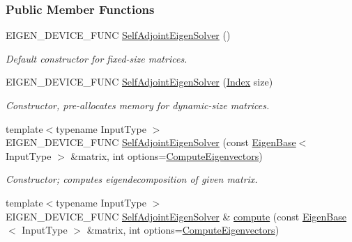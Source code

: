 \subsubsection*{Public Member Functions}
\begin{DoxyCompactItemize}
\item 
E\+I\+G\+E\+N\+\_\+\+D\+E\+V\+I\+C\+E\+\_\+\+F\+U\+NC \hyperlink{group___eigenvalues___module_af3466b3809be4a7738d84493d80d4737}{Self\+Adjoint\+Eigen\+Solver} ()
\begin{DoxyCompactList}\small\item\em Default constructor for fixed-\/size matrices. \end{DoxyCompactList}\item 
E\+I\+G\+E\+N\+\_\+\+D\+E\+V\+I\+C\+E\+\_\+\+F\+U\+NC \hyperlink{group___eigenvalues___module_af20f466a4c29477271e91841e3382b27}{Self\+Adjoint\+Eigen\+Solver} (\hyperlink{group___eigenvalues___module_a8a59ab7734b6eae2754fd78bc7c3a360}{Index} size)
\begin{DoxyCompactList}\small\item\em Constructor, pre-\/allocates memory for dynamic-\/size matrices. \end{DoxyCompactList}\item 
{\footnotesize template$<$typename Input\+Type $>$ }\\E\+I\+G\+E\+N\+\_\+\+D\+E\+V\+I\+C\+E\+\_\+\+F\+U\+NC \hyperlink{group___eigenvalues___module_ade694ed7b0a4d9da9480cedc849be76f}{Self\+Adjoint\+Eigen\+Solver} (const \hyperlink{group___core___module_struct_eigen_1_1_eigen_base}{Eigen\+Base}$<$ Input\+Type $>$ \&matrix, int options=\hyperlink{group__enums_ggae3e239fb70022eb8747994cf5d68b4a9ada93d8885bde32b876ba4af01d3292cc}{Compute\+Eigenvectors})
\begin{DoxyCompactList}\small\item\em Constructor; computes eigendecomposition of given matrix. \end{DoxyCompactList}\item 
{\footnotesize template$<$typename Input\+Type $>$ }\\E\+I\+G\+E\+N\+\_\+\+D\+E\+V\+I\+C\+E\+\_\+\+F\+U\+NC \hyperlink{group___eigenvalues___module_class_eigen_1_1_self_adjoint_eigen_solver}{Self\+Adjoint\+Eigen\+Solver} \& \hyperlink{group___eigenvalues___module_a88bcdc24112efa7c4d2ebb3476efcbe9}{compute} (const \hyperlink{group___core___module_struct_eigen_1_1_eigen_base}{Eigen\+Base}$<$ Input\+Type $>$ \&matrix, int options=\hyperlink{group__enums_ggae3e239fb70022eb8747994cf5d68b4a9ada93d8885bde32b876ba4af01d3292cc}{Compute\+Eigenvectors})

\end{DoxyCompactItemize}
